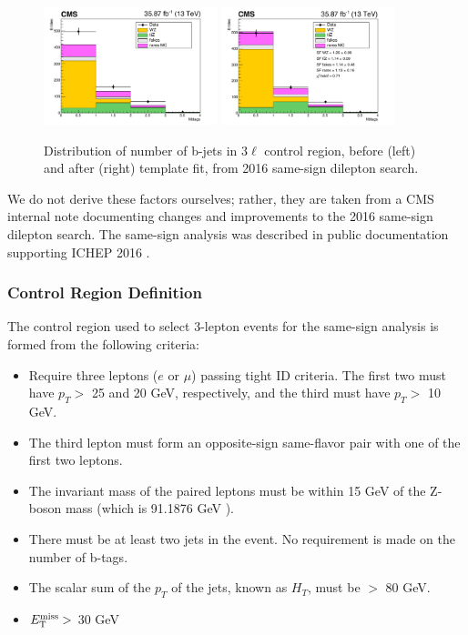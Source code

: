 \begin{figure}[htb]
\centering
\includegraphics[width=0.45\textwidth]{figures/rarebkg_norm_prefit.pdf}
\includegraphics[width=0.45\textwidth]{figures/rarebkg_norm_postfit.pdf}
\caption{Distribution of number of b-jets in 3$\ell$ control region,
  before (left) and after (right) template fit, from 2016 same-sign dilepton search.}
\label{fig:stop:rarebkg:normalization}
\end{figure}

We do not derive these factors ourselves; rather, they are taken
from a CMS internal note documenting changes and improvements to the
2016 same-sign dilepton search. The same-sign analysis was described
in public documentation supporting ICHEP 2016 \cite{samesign}.

\subsubsection{Control Region Definition}
\label{sssec:stop:rarebkg:crdefinitions}

The control region used to select 3-lepton events for the same-sign
analysis is formed from the following criteria:
\begin{itemize}
\item Require three leptons ($e$ or $\mu$) passing tight ID
  criteria. The first two must have $p_T >$ 25 and 20 GeV,
  respectively, and the third must have $p_T >$ 10 GeV.
\item The third lepton must form an opposite-sign same-flavor pair
  with one of the first two leptons.
\item The invariant mass of the paired leptons must be within 15 GeV
  of the Z-boson mass (which is 91.1876 GeV \cite{pdg}).
\item There must be at least two jets in the event. No requirement is
  made on the number of b-tags.
\item The scalar sum of the $p_T$ of the jets, known as $H_T$, must
  be $>$ 80 GeV.
\item $E_\text{T}^\text{miss} >$ 30 GeV
\end{itemize}

